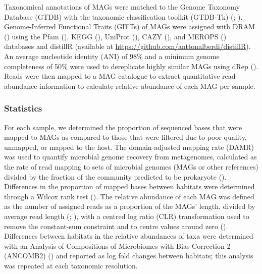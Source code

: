 \documentclass[
  12pt,
]{article}
\begin{document}
Taxonomical annotations of MAGs were matched to the Genome Taxonomy
Database (GTDB) with the taxonomic classification toolkit (GTDB-Tk)
(;
). Genome-Inferred
Functional Traits (GIFTs) of MAGs were assigned with DRAM
() using the Pfam
(), KEGG
(), UniProt
(), CAZY
(), and MEROPS () databases and distillR (available at
\url{https://github.com/anttonalberdi/distillR}). An average nucleotide
identity (ANI) of 98\% and a minimum genome completeness of 50\% were
used to dereplicate highly similar MAGs using dRep
(). Reads were then mapped
to a MAG catalogue to extract quantitative read-abundance information to
calculate relative abundance of each MAG per sample.

\subsubsection{Statistics}\label{statistics}

For each sample, we determined the proportion of sequenced bases that
were mapped to MAGs as compared to those that were filtered due to poor
quality, unmapped, or mapped to the host. The domain-adjusted mapping
rate (DAMR) was used to quantify microbial genome recovery from
metagenomes, calculated as the rate of read mapping to sets of microbial
genomes (MAGs or other references) divided by the fraction of the
community predicted to be prokaryote
().
Differences in the proportion of mapped bases between habitats were
determined through a Wilcox rank test
(). The relative
abundance of each MAG was defined as the number of assigned reads as a
proportion of the MAGs' length, divided by average read length
(;
), with a centred
log ratio (CLR) transformation used to remove the constant-sum
constraint and to centre values around zero
(). Differences
between habitats in the relative abundances of taxa were determined with
an Analysis of Compositions of Microbiomes with Bias Correction 2
(ANCOMB2) () and
reported as log fold changes between habitats; this analysis was
repeated at each taxonomic resolution.
\end{document}
